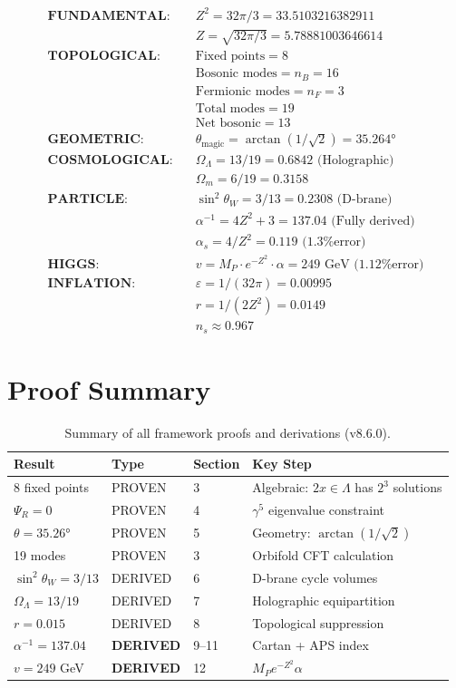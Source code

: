 \documentclass[12pt,a4paper]{article}
\newcommand{\OmegaL}{\Omega_\Lambda}
\newcommand{\OmegaM}{\Omega_m}
\newcommand{\sinW}{\sin^2\theta_W}
\newcommand{\nB}{n_B}
\newcommand{\nF}{n_F}
\newcommand{\Zsq}{Z^2}
\begin{document}
\begin{align}
\textbf{FUNDAMENTAL:} \quad & \Zsq = 32\pi/3 = 33.5103216382911 \\
& Z = \sqrt{32\pi/3} = 5.78881003646614 \\[1em]
\textbf{TOPOLOGICAL:} \quad & \text{Fixed points} = 8 \\
& \text{Bosonic modes} = \nB = 16 \\
& \text{Fermionic modes} = \nF = 3 \\
& \text{Total modes} = 19 \\
& \text{Net bosonic} = 13 \\[1em]
\textbf{GEOMETRIC:} \quad & \theta_{\text{magic}} = \arctan(1/\sqrt{2}) = 35.264° \\[1em]
\textbf{COSMOLOGICAL:} \quad & \OmegaL = 13/19 = 0.6842 \text{ (Holographic)} \\
& \OmegaM = 6/19 = 0.3158 \\[1em]
\textbf{PARTICLE:} \quad & \sinW = 3/13 = 0.2308 \text{ (D-brane)} \\
& \alpha^{-1} = 4\Zsq + 3 = 137.04 \text{ (Fully derived)} \\
& \alpha_s = 4/\Zsq = 0.119 \text{ (1.3\% error)} \\[1em]
\textbf{HIGGS:} \quad & v = M_P \cdot e^{-\Zsq} \cdot \alpha = 249 \text{ GeV (1.12\% error)} \\[1em]
\textbf{INFLATION:} \quad & \varepsilon = 1/(32\pi) = 0.00995 \\
& r = 1/(2\Zsq) = 0.0149 \\
& n_s \approx 0.967
\end{align}

\section{Proof Summary}

\begin{table}[H]
\centering
\begin{tabular}{llll}
\toprule
\textbf{Result} & \textbf{Type} & \textbf{Section} & \textbf{Key Step} \\
\midrule
8 fixed points & PROVEN & 3 & Algebraic: $2x \in \Lambda$ has $2^3$ solutions \\
$\Psi_R = 0$ & PROVEN & 4 & $\gamma^5$ eigenvalue constraint \\
$\theta = 35.26°$ & PROVEN & 5 & Geometry: $\arctan(1/\sqrt{2})$ \\
19 modes & PROVEN & 3 & Orbifold CFT calculation \\
$\sinW = 3/13$ & DERIVED & 6 & D-brane cycle volumes \\
$\OmegaL = 13/19$ & DERIVED & 7 & Holographic equipartition \\
$r = 0.015$ & DERIVED & 8 & Topological suppression \\
$\alpha^{-1} = 137.04$ & \textbf{DERIVED} & 9--11 & Cartan + APS index \\
$v = 249$ GeV & \textbf{DERIVED} & 12 & $M_P e^{-\Zsq} \alpha$ \\
\bottomrule
\end{tabular}
\caption{Summary of all framework proofs and derivations (v8.6.0).}
\end{table}
\end{document}
